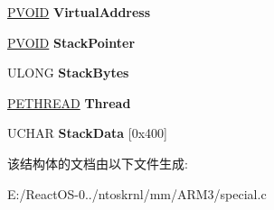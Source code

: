 \begin{DoxyCompactItemize}
\hyperlink{interfacevoid}{P\+V\+O\+ID} {\bfseries Virtual\+Address}
\item 
\mbox{\label{struct___m_i___f_r_e_e_d___s_p_e_c_i_a_l___p_o_o_l_ab4abb0d6049fc1ae4b13cf36f295b21d}} 
\hyperlink{interfacevoid}{P\+V\+O\+ID} {\bfseries Stack\+Pointer}
\item 
\mbox{\label{struct___m_i___f_r_e_e_d___s_p_e_c_i_a_l___p_o_o_l_a4585a14413968c9f41d33bd7f87637f0}} 
U\+L\+O\+NG {\bfseries Stack\+Bytes}
\item 
\mbox{\label{struct___m_i___f_r_e_e_d___s_p_e_c_i_a_l___p_o_o_l_aafb417e3726b9a84ff8c0e92e58d0e09}} 
\hyperlink{struct___e_t_h_r_e_a_d}{P\+E\+T\+H\+R\+E\+AD} {\bfseries Thread}
\item 
\mbox{\label{struct___m_i___f_r_e_e_d___s_p_e_c_i_a_l___p_o_o_l_a282ec4a63451f4e3615a5e3de0e80581}} 
U\+C\+H\+AR {\bfseries Stack\+Data} \mbox{[}0x400\mbox{]}
\end{DoxyCompactItemize}


该结构体的文档由以下文件生成\+:\begin{DoxyCompactItemize}
\item 
E\+:/\+React\+O\+S-\/0../ntoskrnl/mm/\+A\+R\+M3/special.\+c\end{DoxyCompactItemize}
